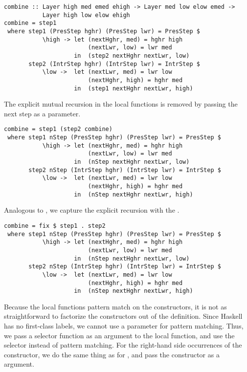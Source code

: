 \documentclass[preprint,natbib]{sigplanconf}
\begin{document}
\begin{small} %
\begin{verbatim}
combine :: Layer high med emed ehigh -> Layer med low elow emed -> 
           Layer high low elow ehigh
combine = step1
 where step1 (PresStep hghr) (PresStep lwr) = PresStep $
           \high -> let (nextHghr, med) = hghr high
                        (nextLwr, low) = lwr med
                    in  (step2 nextHghr nextLwr, low)
       step2 (IntrStep hghr) (IntrStep lwr) = IntrStep $
           \low ->  let (nextLwr, med) = lwr low
                        (nextHghr, high) = hghr med
                    in  (step1 nextHghr nextLwr, high)
\end{verbatim}
\end{small}

The explicit mutual recursion in the local functions is removed by passing the next step as a parameter.

\begin{small}
\begin{verbatim}
combine = step1 (step2 combine)
 where step1 nStep (PresStep hghr) (PresStep lwr) = PresStep $
           \high -> let (nextHghr, med) = hghr high
                        (nextLwr, low) = lwr med
                    in  (nStep nextHghr nextLwr, low)
       step2 nStep (IntrStep hghr) (IntrStep lwr) = IntrStep $
           \low ->  let (nextLwr, med) = lwr low
                        (nextHghr, high) = hghr med
                    in  (nStep nextHghr nextLwr, high)
\end{verbatim}
\end{small}

Analogous to , we capture the explicit recursion with the .

\begin{small} %
\begin{verbatim}
combine = fix $ step1 . step2
 where step1 nStep (PresStep hghr) (PresStep lwr) = PresStep $
           \high -> let (nextHghr, med) = hghr high
                        (nextLwr, low) = lwr med
                    in  (nStep nextHghr nextLwr, low)
       step2 nStep (IntrStep hghr) (IntrStep lwr) = IntrStep $
           \low ->  let (nextLwr, med) = lwr low
                        (nextHghr, high) = hghr med
                    in  (nStep nextHghr nextLwr, high)
\end{verbatim}%
\end{small}

Because the local functions pattern match on the constructors, it is not as straightforward to factorize the constructors out of the definition. Since Haskell has no first-class labels, we cannot use a parameter for pattern matching. Thus, we pass a selector function  as an argument to the local function, and use the selector instead of pattern matching. For the right-hand side occurrences of the constructor, we do the same thing as for , and pass the constructor as a  argument.
\end{document}
